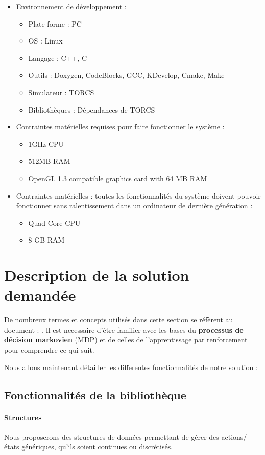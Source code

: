 \documentclass[a4paper,12pt]{article}
\begin{document}
  \begin{itemize}
   \item Environnement de développement :
   \begin{itemize}
    \item Plate-forme : PC
    \item OS : Linux
    \item Langage : C++, C
    \item Outils : Doxygen, CodeBlocks, GCC, KDevelop, Cmake, Make
    \item Simulateur : TORCS
    \item Bibliothèques : Dépendances de TORCS
   \end{itemize}
   \item Contraintes matérielles requises pour faire fonctionner le système :
   \begin{itemize}
    \item 1GHz CPU
    \item 512MB RAM
    \item OpenGL 1.3 compatible graphics card with 64 MB RAM
   \end{itemize}
   \item Contraintes matérielles : toutes les fonctionnalités du système doivent pouvoir fonctionner sans 
   ralentissement dans un ordinateur de dernière génération :
   \begin{itemize}
    \item Quad Core CPU
    \item 8 GB RAM
   \end{itemize}
  \end{itemize}
  
  \vfill
  \newpage 
  \section{Description de la solution demandée}
	De nombreux termes et concepts utilisés dans cette section se réfèrent au document : \cite{PDMIA}. 
	Il est necessaire d'être familier avec les bases du \textbf{processus de décision markovien} (MDP) et de celles 
	de l'apprentissage par renforcement pour comprendre ce qui suit.
	
	Nous allons maintenant détailler les differentes fonctionnalités de notre solution :
	\subsection{Fonctionnalités de la bibliothèque}
		\paragraph{Structures} Nous proposerons des structures de données permettant 
		de gérer des actions/états génériques, qu'ils soient continues ou discrétisés.
		
\end{document}

